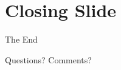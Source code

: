 \documentclass[12pt, aspectratio=169]{beamer}
\begin{document}
\section*{Closing Slide}
\begin{frame}[plain] %
	\begin{center}
		{\Huge The End}
		
		\bigskip\bigskip 
		
		{\LARGE Questions? Comments?}
	\end{center}
\end{frame}

\end{document}
